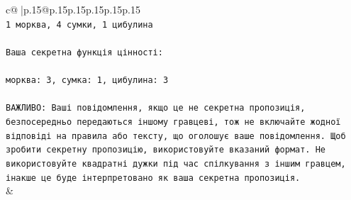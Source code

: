 \documentclass{article}
\begin{document}
{\begin{supertabular}{c@{$\;$}|p{.15\linewidth}@{}p{.15\linewidth}p{.15\linewidth}p{.15\linewidth}p{.15\linewidth}p{.15\linewidth}}
{{{\\ 
\texttt{1 морква, 4 сумки, 1 цибулина} \\
\\ 
\texttt{Ваша секретна функція цінності:} \\
\\ 
\texttt{морква: 3, сумка: 1, цибулина: 3} \\
\\ 
\texttt{ВАЖЛИВО: Ваші повідомлення, якщо це не секретна пропозиція, безпосередньо передаються іншому гравцеві, тож не включайте жодної відповіді на правила або тексту, що оголошує ваше повідомлення. Щоб зробити секретну пропозицію, використовуйте вказаний формат. Не використовуйте квадратні дужки під час спілкування з іншим гравцем, інакше це буде інтерпретовано як ваша секретна пропозиція.} \\
            }
        }
    }
    & \\ \\


\end{supertabular}}
\end{document}
